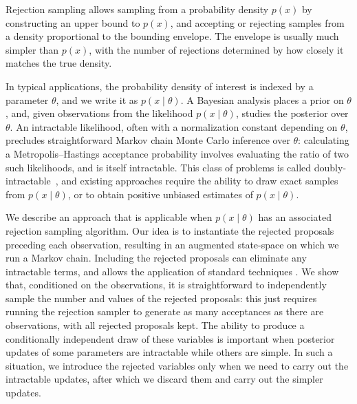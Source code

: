 
Rejection sampling %
allows sampling from a probability density $p(x)$ by %
constructing an upper bound to $p(x)$,
and accepting or rejecting samples from a density proportional to the bounding envelope. 
The envelope is usually much simpler than $p(x)$, with the number of rejections %
determined by how closely it matches the true density. 

In typical applications, the probability density of interest is indexed by a parameter $\theta$, and we write it as $p(x\mid\theta)$. 
A Bayesian analysis places a prior on $\theta$, and, given observations from the likelihood $p(x\mid\theta)$, studies the posterior over $\theta$. 
An intractable likelihood, often with a normalization
constant depending on $\theta$, precludes straightforward Markov chain Monte Carlo inference over $\theta$: calculating a Metropolis--Hastings acceptance probability
involves evaluating the ratio of two such likelihoods, and is itself intractable. This class of problems is called doubly-intractable~\citep{murray2006},
and existing approaches require the ability to draw exact samples
from $p(x\mid\theta)$, or to obtain positive unbiased estimates of $p(x\mid\theta)$.

We describe an approach that is applicable when $p(x\mid\theta)$ has an associated rejection sampling algorithm.
Our idea is to instantiate the rejected proposals preceding each observation, resulting in an augmented state-space on which we run a Markov chain.
Including the rejected proposals %
can eliminate any intractable terms, and allows the application of standard techniques \citep{adams_gpds}.
We show that, conditioned on the observations, it is straightforward to independently sample the number and values of the rejected proposals:
this just requires running the rejection sampler to generate as many acceptances as there are observations, with all rejected proposals kept.
The ability to produce a conditionally independent draw of these variables is important when posterior updates of some parameters are intractable
while others are simple. In such a situation, we introduce the rejected variables only when we need 
to carry out the intractable updates, after which we discard them and carry out the simpler updates.

